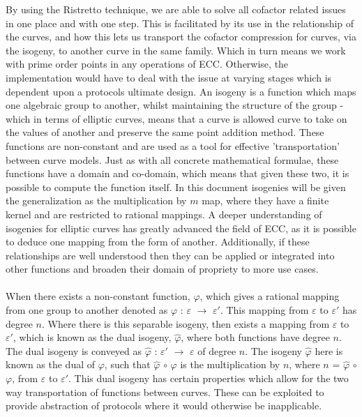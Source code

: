 \documentclass{article}
\theoremstyle{definition}
\theoremstyle{remark}
\begin{document}
	By using the Ristretto technique, we are able to solve all cofactor related issues in one place and with one step. This is facilitated by its use in the relationship of the curves, and how this lets us transport the cofactor compression for curves, via the isogeny, to another curve in the same family. Which in turn means we work with prime order points in any operations of ECC. Otherwise, the implementation would have to deal with the issue at varying stages which is dependent upon a protocols ultimate design. An isogeny is a function which maps one algebraic group to another, whilst maintaining the structure of the group - which in terms of elliptic curves, means that a curve is allowed curve to take on the values of another and preserve the same point addition method. These functions are non-constant and are used as a tool for effective 'transportation' between curve models. Just as with all concrete mathematical formulae, these functions have a domain and co-domain, which means that given these two, it is possible to compute the function itself. In this document isogenies will be given the generalization as the multiplication by $m$ map, where they have a finite kernel and are restricted to rational mappings.  
	A deeper understanding of isogenies for elliptic curves has greatly advanced the field of ECC, as it is possible to deduce one mapping from the form of another. Additionally, if these relationships are well understood then they can be applied or integrated into other functions and broaden their domain of propriety to more use cases.\\\\
	
	When there exists a non-constant function, $\varphi$, which gives a rational mapping from one group to another denoted as $\varphi$ : $\varepsilon$ $\rightarrow$ $\varepsilon\prime$. This mapping from $\varepsilon$ to $\varepsilon\prime$ has degree $n$. Where there is this separable isogeny, then exists a mapping from $\varepsilon$ to $\varepsilon\prime$, which is known as the dual isogeny, $\hat{\varphi}$, where both functions have degree $n$. The dual isogeny is conveyed as $\hat{\varphi}$ : $\varepsilon\prime$ $\rightarrow$ $\varepsilon$ of degree $n$. The isogeny $\hat{\varphi}$ here is known as the dual of $\varphi$, such that $\hat{\varphi}$ $\circ$ $\varphi$ is the multiplication by $n$, where $n$ = $\hat{\varphi}$ $\circ$ $\varphi$, from $\varepsilon$ to $\varepsilon\prime$. This dual isogeny has certain properties which allow for the two way transportation of functions between curves. These can be exploited to provide abstraction of protocols where it would otherwise be inapplicable.
	
\end{document}
